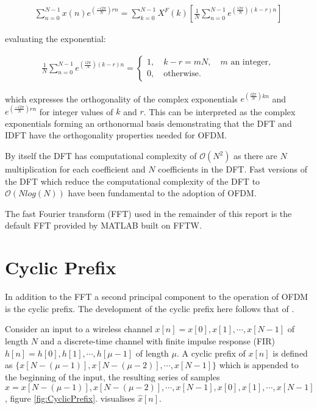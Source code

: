 \begin{align}
	\sum_{n=0}^{N-1}x(n)e^{(\frac{-i 2\pi}{N})rn} = %
	\sum_{k=0}^{N-1}X^{F}(k)\left[\frac{1}{N} \sum_{n=0}^{N-1} %
	e^{(\frac{i 2\pi}{N})(k-r)n}\right]
\end{align}

evaluating the exponential:

\begin{align}
	\frac{1}{N}\sum_{n=0}^{N-1}e^{(\frac{i 2\pi}{N})(k-r)n}%
	= \begin{cases}
		1,\quad k-r = mN, \quad m\text{ an integer},\\
		0,\quad \text{otherwise.}
	\end{cases}
\end{align}

which expresses the orthogonality of the complex exponentials %
$e^{(\frac{i 2\pi}{N})kn}$ and $e^{(\frac{-i 2\pi}{N})rn}$ for %
integer values of $k$ and $r$. This can be interpreted as the %
complex exponentials forming an orthonormal basis demonstrating %
that %
the DFT and IDFT have the orthogonality properties needed for %
OFDM.

By itself the DFT has computational complexity of $\mathcal{O}(%
N^2)$ as there are $N$ multiplication for each coefficient and %
$N$ coefficients in the DFT. Fast versions of the DFT which %
reduce the computational complexity of the DFT to $\mathcal{O}(%
Nlog(N))$ have been fundamental to the adoption of OFDM.%

The fast Fourier transform (FFT) used in the remainder of %
this report %
is the default FFT provided by MATLAB built on FFTW\cite{FFTW}. %
\section{Cyclic Prefix}

In addition to the FFT a second principal component to the %
operation of OFDM is the cyclic prefix. The development of %
the cyclic prefix here follows that of \cite{Goldsmith05}.

Consider an input to a wireless channel $x[n] = x[0],x[1],\cdots,%
x[N-1]$ of length $N$ and a discrete-time channel with finite %
impulse response (FIR) $h[n] = h[0],h[1],\cdots,h[\mu-1]$ of length %
$\mu$. A cyclic prefix of $x[n]$ is defined as $\{x[N-(\mu-1)], %
x[N-(\mu-2)], \cdots, x[N-1]\}$ which is appended to the beginning %
of the input, the resulting series of samples $\hat{x} = x[N-(\mu-1)], %
x[N-(\mu-2)], \cdots, x[N-1], x[0], x[1], \cdots, x[N-1]$, figure %
\ref{fig:CyclicPrefix}. visualises $\hat{x}[n]$.


